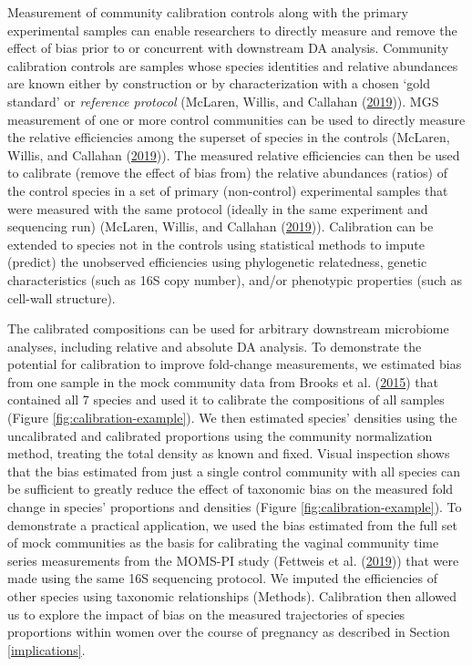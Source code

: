 \documentclass[
]{article}
\begin{document}
Measurement of community calibration controls along with the primary experimental samples can enable researchers to directly measure and remove the effect of bias prior to or concurrent with downstream DA analysis.
Community calibration controls are samples whose species identities and relative abundances are known either by construction or by characterization with a chosen `gold standard' or \emph{reference protocol} (McLaren, Willis, and Callahan (\protect\hyperlink{ref-mclaren2019cons}{2019})).
MGS measurement of one or more control communities can be used to directly measure the relative efficiencies among the superset of species in the controls (McLaren, Willis, and Callahan (\protect\hyperlink{ref-mclaren2019cons}{2019})).
The measured relative efficiencies can then be used to calibrate (remove the effect of bias from) the relative abundances (ratios) of the control species in a set of primary (non-control) experimental samples that were measured with the same protocol (ideally in the same experiment and sequencing run) (McLaren, Willis, and Callahan (\protect\hyperlink{ref-mclaren2019cons}{2019})).
Calibration can be extended to species not in the controls using statistical methods to impute (predict) the unobserved efficiencies using phylogenetic relatedness, genetic characteristics (such as 16S copy number), and/or phenotypic properties (such as cell-wall structure).

The calibrated compositions can be used for arbitrary downstream microbiome analyses, including relative and absolute DA analysis.
To demonstrate the potential for calibration to improve fold-change measurements, we estimated bias from one sample in the mock community data from Brooks et al. (\protect\hyperlink{ref-brooks2015thet}{2015}) that contained all 7 species and used it to calibrate the compositions of all samples (Figure \ref{fig:calibration-example}).
We then estimated species' densities using the uncalibrated and calibrated proportions using the community normalization method, treating the total density as known and fixed.
Visual inspection shows that the bias estimated from just a single control community with all species can be sufficient to greatly reduce the effect of taxonomic bias on the measured fold change in species' proportions and densities (Figure \ref{fig:calibration-example}).
To demonstrate a practical application, we used the bias estimated from the full set of mock communities as the basis for calibrating the vaginal community time series measurements from the MOMS-PI study (Fettweis et al. (\protect\hyperlink{ref-fettweis2019thev}{2019})) that were made using the same 16S sequencing protocol.
We imputed the efficiencies of other species using taxonomic relationships (Methods).
Calibration then allowed us to explore the impact of bias on the measured trajectories of species proportions within women over the course of pregnancy as described in Section \ref{implications}.
\end{document}
